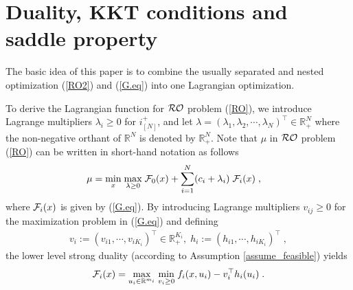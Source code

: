 \documentclass[journal,twoside,web]{ieeecolor}
\begin{document}

\section{Duality, KKT conditions and saddle property} \label{section_saddle}
The basic idea of this paper is to combine the usually separated and nested optimization (\ref{RO2}) and (\ref{G.eq}) into one Lagrangian optimization. 

To derive the Lagrangian function for ${\cal RO}$ problem (\ref{RO}), we introduce Lagrange multipliers $\lambda_i\geq 0$ for $i^+_{[N]}$, and let $\lambda=(\lambda_1,\lambda_2,\cdots,\lambda_N)^\top \in \mathbb{R}_+^N$ where the non-negative orthant of $\mathbb{R}^N$ is denoted by $\mathbb{R}_+^N$. Note that $\mu$ in ${\cal RO}$ problem (\ref{RO}) can be written in short-hand notation  as follows
\begin{align}
\mu=&\;\underset{x}{\min}\;\underset{\lambda\geq 0}{\max}\; {\cal F}_0(x)+\sum_{i=1}^N (c_i+\lambda_i) \; {\cal F}_i(x)\;,
 \label{upper_ro}
\end{align}
where ${\cal F}_i(x)$ is given by (\ref{G.eq}). 
 By introducing Lagrange multipliers $v_{ij} \geq 0$ for the maximization problem in (\ref{G.eq}) and defining 
\begin{align*}
v_i:=(v_{i1},\cdots, v_{iK_i})^\top \in \mathbb{R}_+^{K_i},\;h_i:=(h_{i1},\cdots, h_{iK_i})^\top\;,\nonumber
\end{align*}
the lower level strong duality (according to Assumption \ref{assume_feasible}) yields
\begin{align} \label{lower_ro}
{\cal F}_i(x)=\underset{u_i\in \mathbb{R}^{m_i}}{\max}\;\underset{v_{i}\geq 0}{\min}\;f_i(x,u_i)-v_i^\top h_{i}(u_i)\;.
\end{align}
\end{document}
